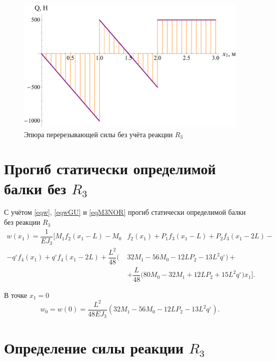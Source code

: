 \documentclass[12pt, a4paper]{article}
\begin{document}
	\begin{figure}[!h]
		\centering
		\includegraphics[width=0.7\linewidth]{plot-9}
		\caption{Эпюра перерезывающей силы без учёта реакции $R_3$}
	\end{figure}
	
	\vspace{-0.75em}
	
	\section{Прогиб статически определимой балки без $R_3$} 
	
	С учётом \eqref{eqw}, \eqref{eqwGU} и \eqref{eqM3NOR} прогиб статически определимой балки без реакции $R_3$
	\begin{equation}
		\begin{split}
			w(x_1) = \dfrac{1}{E J_3} \bigg[ M_1 f_2(x_1 - L) - M_0 & f_2(x_1) + P_1 f_3(x_1 - L) + P_2 f_3(x_1 - 2L) - \\ - q^{\circ} f_4(x_1) + q^{\circ} f_4(x_1 - 2L) + \dfrac{L^2}{48} \big( & 32 M_1 - 56 M_0 - 12L P_2 - 13L^2 q^{\circ} \big) + \\ & + \dfrac{L}{48} \big( 80 M_0 - 32 M_1 + 12L P_2 + 15 L^2 q^{\circ} \big) x_1 \bigg].
		\end{split}
		\label{eqwNOR} 
	\end{equation}
	
	В точке $x_1 = 0$
	\vspace{-0.5em}
	\begin{equation}
		w_{0} = w(0) = \dfrac{L^2}{48 E J_3} \left( 32 M_1 - 56 M_0 - 12L P_2 - 13L^2 q^{\circ} \right).
		\label{eqw0}
	\end{equation}
	
	\newpage
	
	\section{Определение силы реакции $R_3$} 
	
\end{document}
